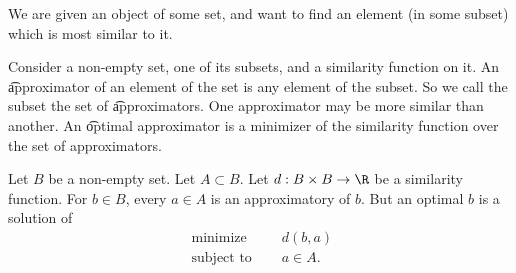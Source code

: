 
\sbasic





























\sstart
{}


We are given an object of some set, and want to find an element (in some subset) which is most similar to it.


Consider a non-empty set, one of its subsets, and a similarity function on it.
An \t{approximator} of an element of the set is any element of the subset.
So we call the subset the set of \t{approximators}.
One approximator may be more similar than another.
An \t{optimal} approximator is a minimizer of the similarity function over the set of approximators.


Let $B$ be a non-empty set.
Let $A \subset B$.
Let $d: B \times B \to \R$ be a similarity function.
For $b \in B$, every $a \in A$ is an approximatory of $b$.
But an optimal $b$ is a solution of
$$
\begin{aligned}
  \text{ minimize }   & \quad d(b, a) \\
  \text{ subject to } & \quad a \in A.
\end{aligned}
$$
\strats
